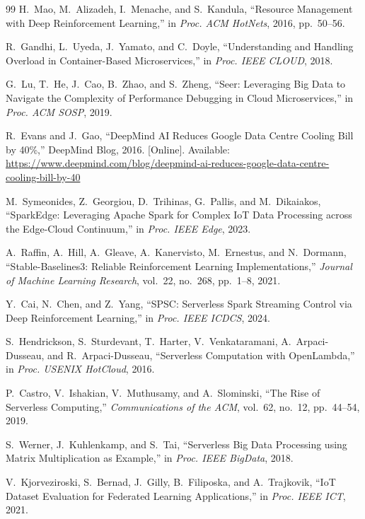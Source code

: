 \documentclass[10pt, conference, compsocconf]{IEEEtran}
\begin{document}
\begin{thebibliography}{99}
H.~Mao, M.~Alizadeh, I.~Menache, and S.~Kandula, ``Resource Management with Deep Reinforcement Learning,'' in \emph{Proc. ACM HotNets}, 2016, pp.~50--56.

R.~Gandhi, L.~Uyeda, J.~Yamato, and C.~Doyle, ``Understanding and Handling Overload in Container-Based Microservices,'' in \emph{Proc. IEEE CLOUD}, 2018.

G.~Lu, T.~He, J.~Cao, B.~Zhao, and S.~Zheng, ``Seer: Leveraging Big Data to Navigate the Complexity of Performance Debugging in Cloud Microservices,'' in \emph{Proc. ACM SOSP}, 2019.

R.~Evans and J.~Gao, ``DeepMind AI Reduces Google Data Centre Cooling Bill by 40\%,'' DeepMind Blog, 2016. [Online]. Available: \url{https://www.deepmind.com/blog/deepmind-ai-reduces-google-data-centre-cooling-bill-by-40}

M.~Symeonides, Z.~Georgiou, D.~Trihinas, G.~Pallis, and M.~Dikaiakos, ``SparkEdge: Leveraging Apache Spark for Complex IoT Data Processing across the Edge-Cloud Continuum,'' in \emph{Proc. IEEE Edge}, 2023.

A.~Raffin, A.~Hill, A.~Gleave, A.~Kanervisto, M.~Ernestus, and N.~Dormann, ``Stable-Baselines3: Reliable Reinforcement Learning Implementations,'' \emph{Journal of Machine Learning Research}, vol.~22, no.~268, pp.~1--8, 2021.

Y.~Cai, N.~Chen, and Z.~Yang, ``SPSC: Serverless Spark Streaming Control via Deep Reinforcement Learning,'' in \emph{Proc. IEEE ICDCS}, 2024.

S.~Hendrickson, S.~Sturdevant, T.~Harter, V.~Venkataramani, A.~Arpaci-Dusseau, and R.~Arpaci-Dusseau, ``Serverless Computation with OpenLambda,'' in \emph{Proc. USENIX HotCloud}, 2016.

P.~Castro, V.~Ishakian, V.~Muthusamy, and A.~Slominski, ``The Rise of Serverless Computing,'' \emph{Communications of the ACM}, vol.~62, no.~12, pp.~44--54, 2019.

S.~Werner, J.~Kuhlenkamp, and S.~Tai, ``Serverless Big Data Processing using Matrix Multiplication as Example,'' in \emph{Proc. IEEE BigData}, 2018.

V.~Kjorveziroski, S.~Bernad, J.~Gilly, B.~Filiposka, and A.~Trajkovik, ``IoT Dataset Evaluation for Federated Learning Applications,'' in \emph{Proc. IEEE ICT}, 2021.

\end{thebibliography}
\end{document}
